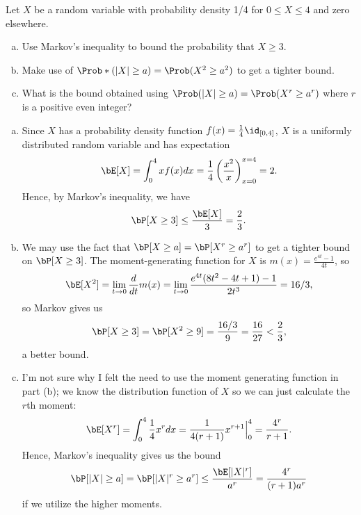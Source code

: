 \begin{homework}[e]
  \prob Let $X$ be a random variable with probability density 1/4 for $0 \leq X \leq 4$ and zero elsewhere.
  \begin{enumerate}[(a)]
    \item Use Markov's inequality to bound the probability that $X \geq 3$.
    \item Make use of $\Prob*(|X| \geq a) = \Prob(X^2 \geq a^2)$ to get a tighter bound.
    \item What is the bound obtained using $\Prob(|X| \geq a) = \Prob(X^r \geq a^r)$ where $r$ is a positive even integer?
  \end{enumerate}
  \begin{prf}
    \begin{enumerate}[(a)]$ $
      \item Since $X$ has a probability density function $f(x) = \frac{1}{4}\id_{[0,4]}$, $X$ is a uniformly distributed random variable and has expectation
        \begin{align*}
          \bE[X] = \int_0^4 xf(x) dx = \frac{1}{4}\left(\frac{x^2}{x}\right)^{x = 4}_{x = 0} = 2.
        \end{align*}
        Hence, by Markov's inequality, we have
        \begin{align*}
          \bP[X \geq 3] \leq \frac{\bE[X]}{3} = \frac{2}{3}.
        \end{align*}
      \item We may use the fact that $\bP[X\geq a] = \bP[X^r \geq a^r]$ to get a tighter bound on $\bP[X\geq 3]$. The moment-generating function for $X$ is $m(x) = \frac{e^{4t}-1}{4t}$, so
        \begin{align*}
          \bE[X^2] = \lim_{t\to 0} \frac{d}{dt} m(x) = \lim_{t\to 0} \frac{e^{4t}(8t^2 - 4t + 1)-1}{2t^3} = 16/3,
        \end{align*}
        so Markov gives us
        \begin{align*}
          \bP[X \geq 3] = \bP[X^2 \geq 9] = \frac{16/3}{9} = \frac{16}{27} < \frac{2}{3},
        \end{align*}
        a better bound.
      \item I'm not sure why I felt the need to use the moment generating function in part (b); we know the distribution function of $X$ so we can just calculate the $r$th moment:
        \begin{align*}
          \bE[X^r] = \int_0^4 \frac{1}{4}x^r dx = \frac{1}{4(r+1)}x^{r+1}\Big|^4_0 = \frac{4^r}{r+1}.
        \end{align*}
        Hence, Markov's inequality gives us the bound
        \begin{align*}
          \bP[|X| \geq a] = \bP[|X|^r \geq a^r] \leq \frac{\bE[|X|^r]}{a^r} = \frac{4^r}{(r+1)a^r}
        \end{align*}
        if we utilize the higher moments. 
    \end{enumerate}
  \end{prf}


\end{homework}
